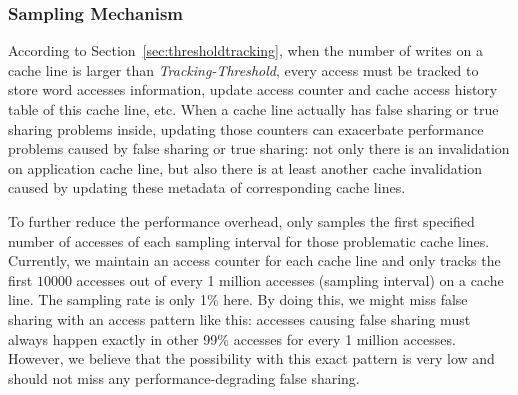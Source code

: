 \subsubsection{Sampling Mechanism}
\label{sec:sample}
According to Section~\ref{sec:thresholdtracking}, 
when the number of writes on a cache line is larger than {\it Tracking-Threshold}, 
every access must be tracked to store word accesses information, update access counter and 
cache access history table of this cache line, etc. 
When a cache line actually has false sharing or true sharing problems inside,
updating those counters can exacerbate performance problems caused by false sharing or true
sharing: 
not only there is an invalidation on application cache line, 
but also there is
at least another cache invalidation caused by updating these metadata of corresponding cache lines.

To further reduce the performance overhead, \Predator{} only samples the first specified
number of accesses of each sampling interval for those problematic cache lines. 
Currently, we maintain an access counter for each cache line 
and only tracks the first $10000$ accesses out of  every 1 million accesses 
(sampling interval) on a cache line.
The sampling rate is only 1\% here.
By doing this, we might miss false sharing with an access pattern like this:
accesses causing false sharing must always 
happen exactly in other 99\% accesses for every 1 million accesses.
However, we believe that the possibility with this exact pattern is very low and \Predator{} 
should not miss any performance-degrading false sharing.  

